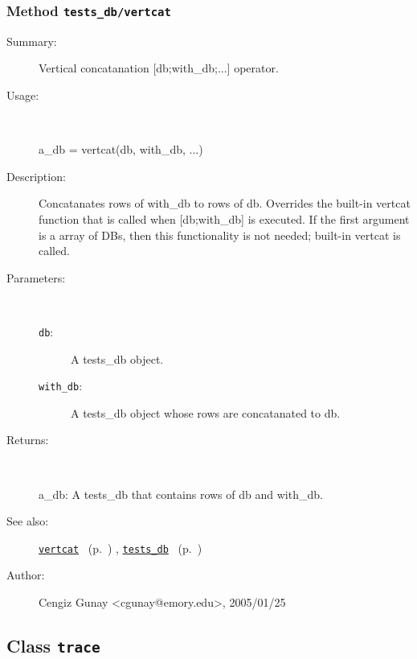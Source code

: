 \subsubsection[Method \texttt{vertcat}]{Method \texttt{tests\_db/vertcat}}%
%
\label{ref_tests_db__vertcat}%
\hypertarget{ref_tests_db__vertcat}{}%
\begin{description}
\item[Summary:]Vertical concatanation [db;with\_db;...] operator.
%
\item[Usage:]~%
\begin{lyxcode}%
a\_db = vertcat(db, with\_db, ...)
%
\end{lyxcode}%
%
\item[Description:]%
Concatanates rows of with\_db to rows of db. Overrides the built-in
 vertcat function that is called when [db;with\_db] is executed. If the 
 first argument is a array of DBs, then this functionality is not needed;
 built-in vertcat is called.
\item[Parameters:]~
\begin{description}%
\item[\texttt{db}:]
 A tests\_db object.
\item[\texttt{with\_db}:]
 A tests\_db object whose rows are concatanated to db.
\end{description}%
%
\item[Returns:
]~

	a\_db: A tests\_db that contains rows of db and with\_db.
%
%
\item[See also:]%
\hyperlink{ref_vertcat}{\texttt{vertcat}}%
\ (p.~\pageref{ref_vertcat})%
%
, \hyperlink{ref_tests_db}{\texttt{tests\_db}}%
\ (p.~\pageref{ref_tests_db})%
%
%
\item[Author:]%
Cengiz Gunay <cgunay@emory.edu>, 2005/01/25
%
\end{description}
\methodline%
\subsection{Class \texttt{trace}}%
%
\label{ref_trace}%
\hypertarget{ref_trace}{}%
